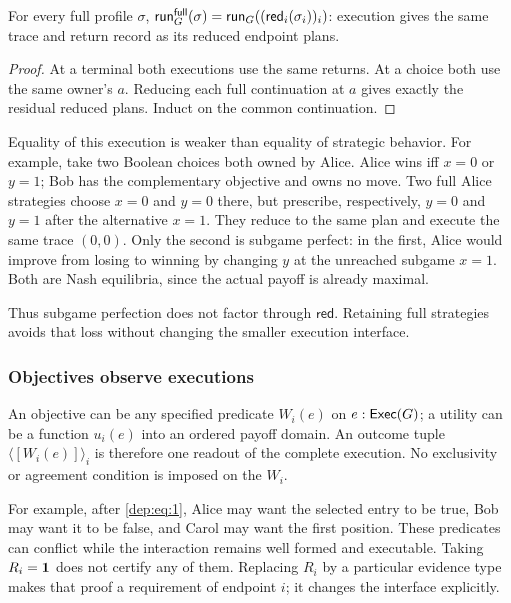\begin{lemma}
\label{thm:adequacy}
For every full profile $\sigma$,
$\mathsf{run}_G^{\mathsf{full}}(\sigma)
 =\mathsf{run}_G((\mathsf{red}_i(\sigma_i))_i)$:
execution gives the same trace and return record as its reduced endpoint
plans.
\end{lemma}
\begin{proof}
At a terminal both executions use the same returns. At a choice both use
the same owner's $a$. Reducing each full continuation at $a$ gives exactly
the residual reduced plans. Induct on the common continuation.
\end{proof}

Equality of this execution is weaker than equality of strategic behavior.
For example, take two Boolean choices both owned by Alice. Alice wins iff
$x=0$ or $y=1$; Bob has the complementary objective and owns no move.
Two full Alice strategies choose $x=0$ and $y=0$ there, but prescribe,
respectively, $y=0$ and $y=1$ after the alternative $x=1$.
They reduce to the same plan and execute the same trace $(0,0)$.
Only the second is subgame perfect: in the first, Alice would improve
from losing to winning by changing $y$ at the unreached subgame $x=1$.
Both are Nash equilibria, since the actual payoff is already maximal.

Thus subgame perfection does not factor through $\mathsf{red}$.
Retaining full strategies avoids that loss without changing the smaller
execution interface.

\subsubsection{Objectives observe executions}

An objective can be any specified predicate $W_i(e)$ on $e:\mathsf{Exec}(G)$; a utility
can be a function $u_i(e)$ into an ordered payoff domain. An outcome tuple
$\langle[W_i(e)]\rangle_i$ is therefore one readout of the complete execution.
No exclusivity or agreement condition is imposed on the $W_i$.

For example, after \eqref{dep:eq:1}, Alice may want the selected entry to be true, Bob may
want it to be false, and Carol may want the first position. These predicates
can conflict while the interaction remains well formed and executable.
Taking $R_i=\mathbf 1$ does not certify any of them. Replacing $R_i$ by a
particular evidence type makes that proof a requirement of endpoint $i$;
it changes the interface explicitly.

